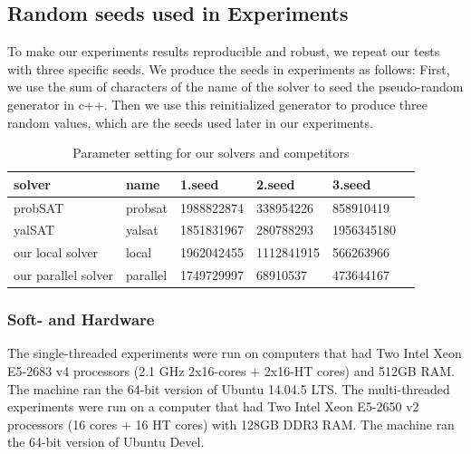 \documentclass[12pt,a4paper,twoside]{scrartcl}
\numberwithin{equation}{section}
\begin{document}
\subsection{Random seeds used in Experiments}
\label{sec:seed}
To make our experiments results reproducible and robust, we repeat our tests with three specific seeds. We produce the seeds in experiments as follows: First, we use the sum of characters of the name of the solver to seed the pseudo-random generator in c++.  Then we use this reinitialized generator to produce three random values, which are the seeds used later in our experiments. 
\begin{table}[h!]
\begin{center}
    \begin{tabular}{|l|l|l|l|l|p{1cm}|}
\hline 
    solver&name&1.seed&2.seed&3.seed \\ \hline
	probSAT&probsat&1988822874&338954226 &858910419 \\ \hline
	yalSAT &yalsat&1851831967&280788293&1956345180 \\ \hline
	our local solver & local&1962042455&1112841915&566263966 \\ \hline
	our parallel solver & parallel &1749729997& 68910537& 473644167 \\ \hline
	
\end{tabular}
\caption[probSAT]{Parameter setting for our solvers and competitors}
\end{center}
\end{table} 
\subsubsection{Soft- and Hardware}
The single-threaded experiments were run on computers that had Two Intel Xeon E5-2683 v4 processors  (2.1 GHz 2x16-cores + 2x16-HT cores) and 512GB RAM. The machine ran the 64-bit version
of  Ubuntu 14.04.5 LTS. The multi-threaded experiments were run on a computer that had Two Intel Xeon E5-2650 v2 processors (16 cores + 16 HT cores) with 128GB DDR3 RAM. The machine ran the 64-bit version of Ubuntu Devel. 
\clearpage
\end{document}
